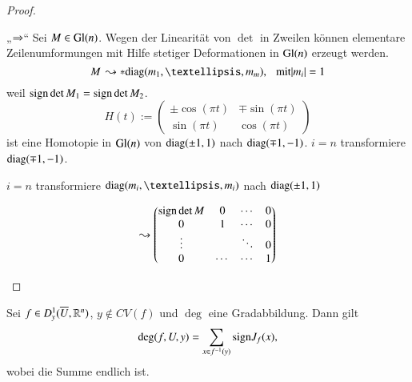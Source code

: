 \begin{proof}
    \begin{description}
    \item{„$\Rightarrow$“} Sei $M\in \mathrm{Gl}(n)$. Wegen der Linearität von $\det $ in Zweilen können elementare
    Zeilenumformungen mit Hilfe stetiger Deformationen in $\mathrm{Gl}(n)$ erzeugt werden.
    \[
        M \, \leadsto*\diag(m_1,…,m_m), \qq \text{mit} |m_i|=1
    \]
    weil $\mathrm{sign} \det M_1=\mathrm{sign} \det M_2$.
    \[
        H(t):= \begin{pmatrix} \pm \cos (\pi t)& \mp \sin(\pi t)\\ \sin(\pi t) & \cos(\pi t)\end{pmatrix}
    \]
    ist eine Homotopie in $\mathrm{Gl}(n)$ von $\mathrm{diag}(\pm 1,1)$ nach $\mathrm{diag}(\mp 1,-1)$. $i=n$ transformiere
    $\mathrm{diag}(\mp 1,-1)$.

    \noindent $i=n$ transformiere $\diag(m_i,…,m_i)$ nach $\mathrm{diag}(\pm1,1)$

    \[
        \leadsto \begin{pmatrix} \mathrm{sign}\det M& 0& \cdots&0\\ 0& 1 &\cdots&0\\\vdots&&\ddots&0\\ 0&\cdots&
        \cdots& 1\end{pmatrix}
    \]

    \end{description}
\end{proof}

\begin{theorem}
    Sei $f\in D_y^1(\overline U, \mathbb{R}^n)$, $y\nin CV(f)$ und $\deg$ eine Gradabbildung. Dann gilt
    \[
        \deg(f,U,y)=\sum_{x\in f^{-1}(y)} \mathrm{sign} J_f(x),
    \]
    wobei die Summe endlich ist.
\end{theorem}

